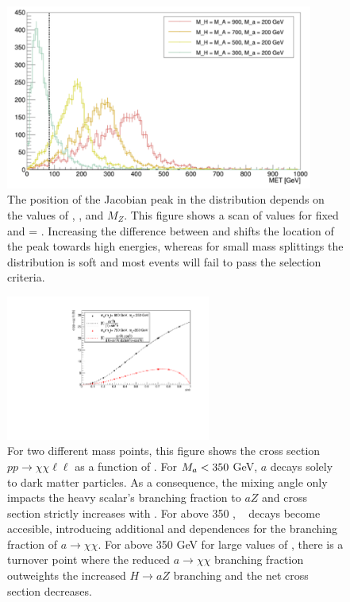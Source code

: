 \begin{figure}
\includegraphics[width=0.9\textwidth]{texinputs/04_grid/figures/monoz/leptonic/mA_Scan.pdf}
\caption{The position of the Jacobian peak in the \MET distribution depends on the values of \mH, \ma, and $M_{Z}$.  This figure shows a scan of \mH values for fixed \ma and \mA = \mH.  Increasing the difference between \mH and \ma shifts the location of the peak towards high energies, whereas for small mass splittings the \MET distribution is soft and most events will fail to pass the \MET selection criteria.}   
\label{fig:monoz_ll_mA_scan}
\end{figure}

\begin{figure}
\centering
\includegraphics[width=0.6\textwidth]{texinputs/04_grid/figures/monoz/leptonic/SinThetaScan_xsecs.pdf}
\caption{For two different mass points, this figure shows the cross section $pp\rightarrow\chi\chi\ell\ell$ as a function of \sinp. 
For $M_{a} < 350$ GeV, $a$ decays solely to dark matter particles.  
As a consequence, the mixing angle only impacts the heavy scalar's branching fraction to $aZ$ and 
cross section strictly increases with \sinp.  
For \ma above 350 \GeV, \ttbar~ decays become accesible, introducing additional \sinp and \cosp dependences for the branching fraction 
of $a\rightarrow\chi\chi$.  For \ma above 350 GeV for large values of \sinp, there is a turnover point where the reduced $a\rightarrow\chi\chi$ branching fraction outweights the increased $H \rightarrow aZ$ branching and the net cross section decreases.}
\label{fig:monoz_ll_sinp_scan_xsec}
\end{figure}


